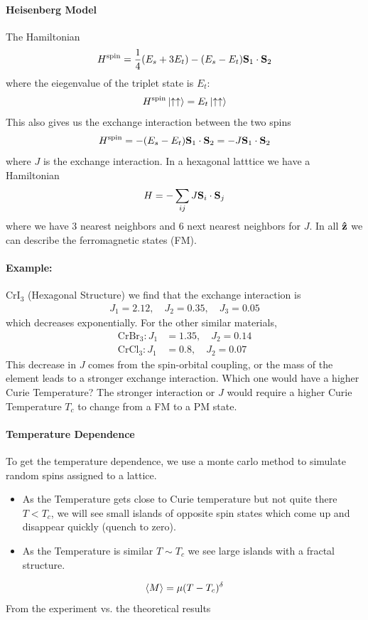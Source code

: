 \documentclass[../main.tex]{subfiles}
\begin{document}
\paragraph*{Heisenberg Model}
The Hamiltonian
\begin{align*}
    H^{\text{spin}} = \frac{1}{4} (E_s + 3E_t) - (E_s - E_t) \vb S_1 \cdot \vb S_2
\end{align*}
where the eiegenvalue of the triplet state is $E_t$:
\begin{align*}
    H^{\text{spin}} \ket{\uparrow \uparrow} = E_t \ket{\uparrow \uparrow}
\end{align*}
This also gives us the exchange interaction between the two spins
\begin{align*}
    H^{\text{spin}} = - (E_s - E_t) \vb S_1 \cdot \vb S_2 = - J \vb S_1 \cdot \vb S_2
\end{align*}
where $J$ is the exchange interaction. In a hexagonal latttice we have a Hamiltonian
\begin{align*}
    H = - \sum_{ij} J \vb S_i \cdot \vb S_j
\end{align*}
where we have 3 nearest neighbors and 6 next nearest neighbors for $J$. In all $\vu z$ we can
describe the ferromagnetic states (FM). 
\paragraph*{Example:} $\mathrm{CrI}_3$ (Hexagonal Structure) we find that the exchange interaction is
\begin{align*}
    J_1 = 2.12, \quad J_2 = 0.35, \quad J_3 = 0.05
\end{align*}
which decreases exponentially. For the other similar materials,
\begin{align*}
    \mathrm{CrBr}_3: J_1 &= 1.35, \quad J_2 = 0.14 \\
    \mathrm{CrCl}_3: J_1 &= 0.8, \quad J_2 = 0.07
\end{align*}
This decrease in $J$ comes from the spin-orbital coupling, or the mass of the element leads to a
stronger exchange interaction. Which one would have a higher Curie Temperature? The stronger 
interaction or $J$ would require a higher Curie Temperature $T_c$ to change from a FM to a PM state.

\paragraph*{Temperature Dependence} To get the temperature dependence, we use a monte carlo method
to simulate random spins assigned to a lattice. 
\begin{itemize}
    \item As the Temperature gets close to Curie temperature 
    but not quite there $T < T_c$, we will see small islands of opposite spin states which come up and
    disappear quickly (quench to zero).
    \item As the Temperature is similar $T \sim T_c$ we see large islands with a fractal structure.
\end{itemize}
\begin{align*}
    \expval{M} = \mu (T - T_c)^\delta
\end{align*}
From the experiment vs. the theoretical results
\end{document}
